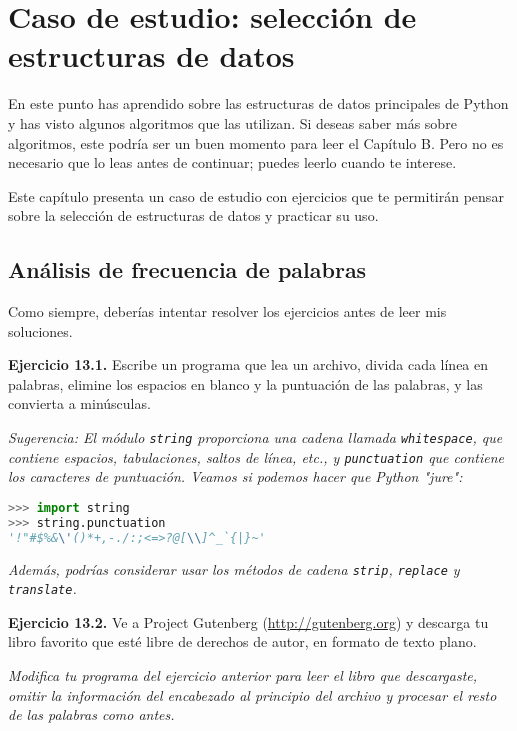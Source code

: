 \chapter{Caso de estudio: selección de estructuras de datos}

En este punto has aprendido sobre las estructuras de datos principales de Python y has visto algunos algoritmos que las utilizan. Si deseas saber más sobre algoritmos, este podría ser un buen momento para leer el Capítulo B. Pero no es necesario que lo leas antes de continuar; puedes leerlo cuando te interese.

Este capítulo presenta un caso de estudio con ejercicios que te permitirán pensar sobre la selección de estructuras de datos y practicar su uso.

\section{Análisis de frecuencia de palabras}

Como siempre, deberías intentar resolver los ejercicios antes de leer mis soluciones.

\textbf{Ejercicio 13.1.} Escribe un programa que lea un archivo, divida cada línea en palabras, elimine los espacios en blanco y la puntuación de las palabras, y las convierta a minúsculas.

\textit{Sugerencia: El módulo \texttt{string} proporciona una cadena llamada \texttt{whitespace}, que contiene espacios, tabulaciones, saltos de línea, etc., y \texttt{punctuation} que contiene los caracteres de puntuación. Veamos si podemos hacer que Python "jure":}

\begin{lstlisting}[language=Python]
>>> import string
>>> string.punctuation
'!"#$%&\'()*+,-./:;<=>?@[\\]^_`{|}~'
\end{lstlisting}

\textit{Además, podrías considerar usar los métodos de cadena \texttt{strip}, \texttt{replace} y \texttt{translate}.}

\textbf{Ejercicio 13.2.} Ve a Project Gutenberg (\url{http://gutenberg.org}) y descarga tu libro favorito que esté libre de derechos de autor, en formato de texto plano.

\textit{Modifica tu programa del ejercicio anterior para leer el libro que descargaste, omitir la información del encabezado al principio del archivo y procesar el resto de las palabras como antes.}

